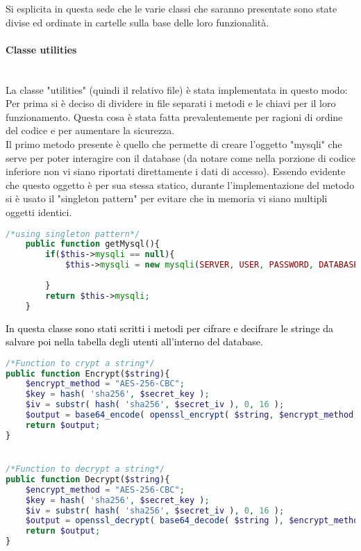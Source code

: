 Si esplicita in questa sede che le varie classi che saranno presentate sono state divise ed ordinate in cartelle sulla base delle loro funzionalità.\\

\paragraph{Classe utilities}\leavevmode\\
La classe "utilities" (quindi il relativo file) è stata implementata in questo modo:\\
Per prima si è deciso di dividere in file separati i metodi e le chiavi per il loro funzionamento. Questa cosa è stata fatta prevalentemente per ragioni di ordine del codice e per aumentare la sicurezza.\\
Il primo metodo presente è quello che permette di creare l'oggetto "mysqli" che serve per poter interagire con il database (da notare come nella porzione di codice inferiore non vi siano riportati direttamente i dati di accesso). Essendo evidente che questo oggetto è per sua stessa statico, durante l'implementazione del metodo si è usato il "singleton pattern" per evitare che in memoria vi siano multipli oggetti identici.\\

\begin{lstlisting}[language=php]
	/*using singleton pattern*/
	public function getMysql(){
		if($this->mysqli == null){
			$this->mysqli = new mysqli(SERVER, USER, PASSWORD, DATABASE);
			
		}
		return $this->mysqli;
	}
\end{lstlisting}

\textcolor{black}{In questa classe sono stati scritti i metodi per cifrare e decifrare le stringe da salvare poi nella tabella degli utenti all'interno del database.}\\

\begin{lstlisting}[language=php]
/*Function to crypt a string*/
public function Encrypt($string){
	$encrypt_method = "AES-256-CBC";
	$key = hash( 'sha256', $secret_key );
	$iv = substr( hash( 'sha256', $secret_iv ), 0, 16 );
	$output = base64_encode( openssl_encrypt( $string, $encrypt_method, $key, 0, $iv ) );
	return $output;
}


/*Function to decrypt a string*/
public function Decrypt($string){
	$encrypt_method = "AES-256-CBC";
	$key = hash( 'sha256', $secret_key );
	$iv = substr( hash( 'sha256', $secret_iv ), 0, 16 );
	$output = openssl_decrypt( base64_decode( $string ), $encrypt_method, $key, 0, $iv );
	return $output;
}
\end{lstlisting}

